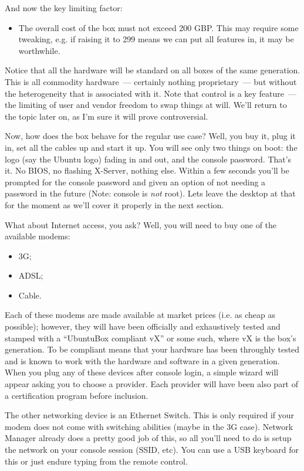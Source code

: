 \documentclass{memoir}
\begin{document}
And now the key limiting factor:

\begin{itemize}
\item The overall cost of the box must not exceed 200 GBP. This may
  require some tweaking, e.g. if raising it to 299 means we can put
  all features in, it may be worthwhile.
\end{itemize}

Notice that all the hardware will be standard on all boxes of the same
generation. This is all commodity hardware~--- certainly nothing
proprietary~--- but without the heterogeneity that is associated with
it. Note that control is a key feature~--- the limiting of user and
vendor freedom to swap things at will. We'll return to the topic later
on, as I'm sure it will prove controversial.

Now, how does the box behave for the regular use case? Well, you buy
it, plug it in, set all the cables up and start it up. You will see
only two things on boot: the logo (say the Ubuntu logo) fading in and
out, and the console password. That's it. No BIOS, no flashing
X-Server, nothing else. Within a few seconds you'll be prompted for
the console password and given an option of not needing a password in
the future (Note: console is \emph{not} root). Lets leave the desktop at
that for the moment as we'll cover it properly in the next section.

What about Internet access, you ask? Well, you will need to buy one of
the available modems:

\begin{itemize}
\item 3G;
\item ADSL;
\item Cable.
\end{itemize}

Each of these modems are made available at market prices (i.e. as
cheap as possible); however, they will have been officially and
exhaustively tested and stamped with a ``UbuntuBox compliant vX'' or
some such, where vX is the box's generation. To be compliant means
that your hardware has been throughly tested and is known to work with
the hardware and software in a given generation. When you plug any of
these devices after console login, a simple wizard will appear asking
you to choose a provider. Each provider will have been also part of a
certification program before inclusion.

The other networking device is an Ethernet Switch. This is only
required if your modem does not come with switching abilities (maybe
in the 3G case). Network Manager already does a pretty good job of
this, so all you'll need to do is setup the network on your console
session (SSID, etc). You can use a USB keyboard for this or just
endure typing from the remote control.
\end{document}
